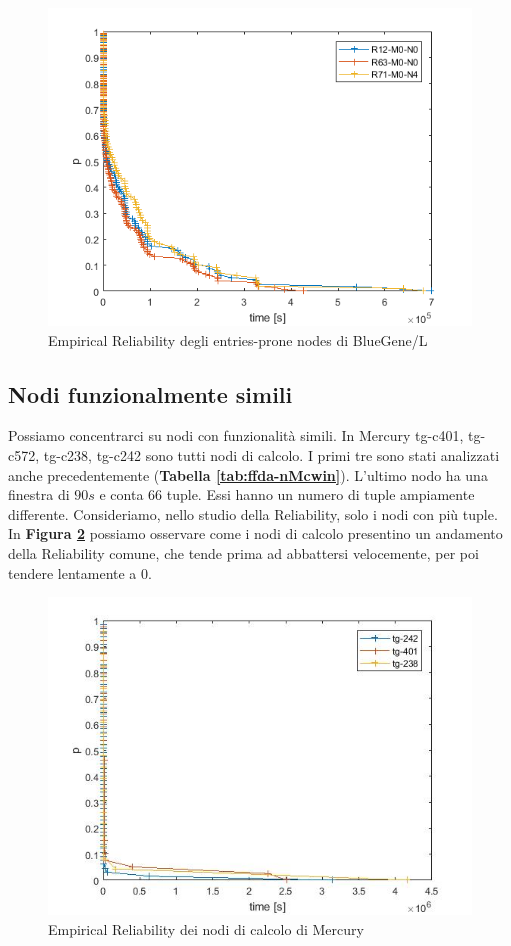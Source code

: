 		\begin{figure}[H]
			\centering
			\includegraphics[scale=0.7]{./immagine/nodiBGrel.png}
			\caption{Empirical Reliability degli entries-prone nodes di BlueGene/L}
			\label{fig:ffda-nBGrel}
		\end{figure}
	
		\subsection{Nodi funzionalmente simili}
			Possiamo concentrarci su nodi con funzionalità simili.
			In Mercury tg-c401, tg-c572, tg-c238, tg-c242 sono tutti nodi di calcolo.  I primi tre sono stati analizzati anche precedentemente (\textbf{Tabella \ref{tab:ffda-nMcwin}}). L'ultimo nodo ha una finestra di $90s$ e conta 66 tuple. Essi hanno un numero di tuple ampiamente differente. Consideriamo, nello studio della Reliability, solo i nodi con più tuple. In \textbf{Figura \ref{fig:ffda-nCrel}} possiamo osservare come i nodi di calcolo presentino un andamento della Reliability comune, che tende prima ad abbattersi velocemente, per poi tendere lentamente a 0.
			
			\begin{figure}[H]
				\centering
				\includegraphics[scale=0.6]{./immagine/nodiCrel.jpg}
				\caption{Empirical Reliability dei nodi di calcolo di Mercury}
				\label{fig:ffda-nCrel}
			\end{figure}
			

